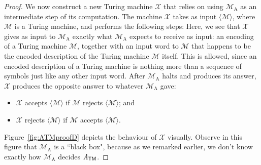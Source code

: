 \begin{theorem}
\begin{proof}
We now construct a new Turing machine $\mathcal{X}$ that relies on using $\mathcal{M}_{\mathrm{A}}$ as an intermediate step of its computation. The machine $\mathcal{X}$ takes as input $\langle \mathcal{M} \rangle$, where $\mathcal{M}$ is a Turing machine, and performs the following steps:
\noindent
Here, we see that $\mathcal{X}$ gives as input to $\mathcal{M}_{\mathrm{A}}$ exactly what $\mathcal{M}_{\mathrm{A}}$ expects to receive as input: an encoding of a Turing machine $\mathcal{M}$, together with an input word to $\mathcal{M}$ that happens to be the encoded description of the Turing machine $\mathcal{M}$ itself. This is allowed, since an encoded description of a Turing machine is nothing more than a sequence of symbols just like any other input word. After $\mathcal{M}_{\mathrm{A}}$ halts and produces its answer, $\mathcal{X}$ produces the opposite answer to whatever $\mathcal{M}_{\mathrm{A}}$ gave:
\begin{itemize}
\item $\mathcal{X}$ accepts $\langle \mathcal{M} \rangle$ if $\mathcal{M}$ rejects $\langle \mathcal{M} \rangle$; and
\item $\mathcal{X}$ rejects $\langle \mathcal{M} \rangle$ if $\mathcal{M}$ accepts $\langle \mathcal{M} \rangle$.
\end{itemize}
Figure~\ref{fig:ATMproofD} depicts the behaviour of $\mathcal{X}$ visually. Observe in this figure that $\mathcal{M}_{\mathrm{A}}$ is a ``black box", because as we remarked earlier, we don't know exactly how $\mathcal{M}_{\mathrm{A}}$ decides $\mathit{A}_{\textsf{TM}}$.


\end{proof}
\end{theorem}
